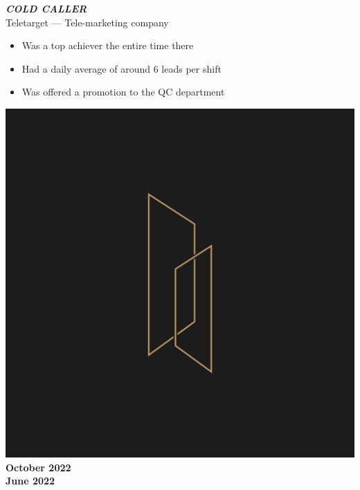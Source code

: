 \documentclass[10pt]{article}
\newcommand{\fancy}[1]{\Large\textbf{\textit{#1}}}
\begin{document}
\vspace{3em}

\noindent
\begin{minipage}{0.7\textwidth}
 \fancy{COLD CALLER} \\
{\large Teletarget --- Tele-marketing company} \\
\begin{itemize}
    \item Was a top achiever the entire time there
    \item Had a daily average of around 6 leads per shift
    \item Was offered a promotion to the QC department
\end{itemize}   
\end{minipage}
\hspace{-2pt}
\begin{minipage}{0.2\textwidth}
\begin{center}
\includegraphics[width=\textwidth]{tt_coldcalling.jpg} \\
    \large\textbf{October 2022\\June 2022}
\end{center}
\end{minipage}

\vspace{3em}
\end{document}
